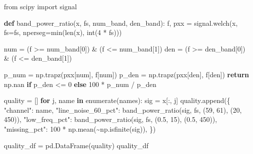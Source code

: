 \documentclass[
  spanish,
  a4paper,
  DIV=11,
  numbers=noendperiod]{scrreprt}
\newenvironment{Shaded}{\begin{snugshade}}{\end{snugshade}}
\newcommand{\BuiltInTok}[1]{\textcolor[rgb]{0.00,0.23,0.31}{#1}}
\newcommand{\ControlFlowTok}[1]{\textcolor[rgb]{0.00,0.23,0.31}{\textbf{#1}}}
\newcommand{\DecValTok}[1]{\textcolor[rgb]{0.68,0.00,0.00}{#1}}
\newcommand{\FloatTok}[1]{\textcolor[rgb]{0.68,0.00,0.00}{#1}}
\newcommand{\ImportTok}[1]{\textcolor[rgb]{0.00,0.46,0.62}{#1}}
\newcommand{\KeywordTok}[1]{\textcolor[rgb]{0.00,0.23,0.31}{\textbf{#1}}}
\newcommand{\NormalTok}[1]{\textcolor[rgb]{0.00,0.23,0.31}{#1}}
\newcommand{\OperatorTok}[1]{\textcolor[rgb]{0.37,0.37,0.37}{#1}}
\newcommand{\StringTok}[1]{\textcolor[rgb]{0.13,0.47,0.30}{#1}}
\begin{document}
\begin{Shaded}
\begin{Highlighting}[]
\ImportTok{from}\NormalTok{ scipy }\ImportTok{import}\NormalTok{ signal}


\KeywordTok{def}\NormalTok{ band\_power\_ratio(x, fs, num\_band, den\_band):}
\NormalTok{    f, pxx }\OperatorTok{=}\NormalTok{ signal.welch(x, fs}\OperatorTok{=}\NormalTok{fs, nperseg}\OperatorTok{=}\BuiltInTok{min}\NormalTok{(}\BuiltInTok{len}\NormalTok{(x), }\BuiltInTok{int}\NormalTok{(}\DecValTok{4} \OperatorTok{*}\NormalTok{ fs)))}

\NormalTok{    num }\OperatorTok{=}\NormalTok{ (f }\OperatorTok{\textgreater{}=}\NormalTok{ num\_band[}\DecValTok{0}\NormalTok{]) }\OperatorTok{\&}\NormalTok{ (f }\OperatorTok{\textless{}=}\NormalTok{ num\_band[}\DecValTok{1}\NormalTok{])}
\NormalTok{    den }\OperatorTok{=}\NormalTok{ (f }\OperatorTok{\textgreater{}=}\NormalTok{ den\_band[}\DecValTok{0}\NormalTok{]) }\OperatorTok{\&}\NormalTok{ (f }\OperatorTok{\textless{}=}\NormalTok{ den\_band[}\DecValTok{1}\NormalTok{])}

\NormalTok{    p\_num }\OperatorTok{=}\NormalTok{ np.trapz(pxx[num], f[num])}
\NormalTok{    p\_den }\OperatorTok{=}\NormalTok{ np.trapz(pxx[den], f[den])}
    \ControlFlowTok{return}\NormalTok{ np.nan }\ControlFlowTok{if}\NormalTok{ p\_den }\OperatorTok{\textless{}=} \DecValTok{0} \ControlFlowTok{else} \DecValTok{100} \OperatorTok{*}\NormalTok{ p\_num }\OperatorTok{/}\NormalTok{ p\_den}


\NormalTok{quality }\OperatorTok{=}\NormalTok{ []}
\ControlFlowTok{for}\NormalTok{ j, name }\KeywordTok{in} \BuiltInTok{enumerate}\NormalTok{(names):}
\NormalTok{    sig }\OperatorTok{=}\NormalTok{ x[:, j]}
\NormalTok{    quality.append(\{}
        \StringTok{"channel"}\NormalTok{: name,}
        \StringTok{"line\_noise\_60\_pct"}\NormalTok{: band\_power\_ratio(sig, fs, (}\DecValTok{59}\NormalTok{, }\DecValTok{61}\NormalTok{), (}\DecValTok{20}\NormalTok{, }\DecValTok{450}\NormalTok{)),}
        \StringTok{"low\_freq\_pct"}\NormalTok{: band\_power\_ratio(sig, fs, (}\FloatTok{0.5}\NormalTok{, }\DecValTok{15}\NormalTok{), (}\FloatTok{0.5}\NormalTok{, }\DecValTok{450}\NormalTok{)),}
        \StringTok{"missing\_pct"}\NormalTok{: }\DecValTok{100} \OperatorTok{*}\NormalTok{ np.mean(}\OperatorTok{\textasciitilde{}}\NormalTok{np.isfinite(sig)),}
\NormalTok{    \})}

\NormalTok{quality\_df }\OperatorTok{=}\NormalTok{ pd.DataFrame(quality)}
\NormalTok{quality\_df}
\end{Highlighting}
\end{Shaded}
\end{document}
